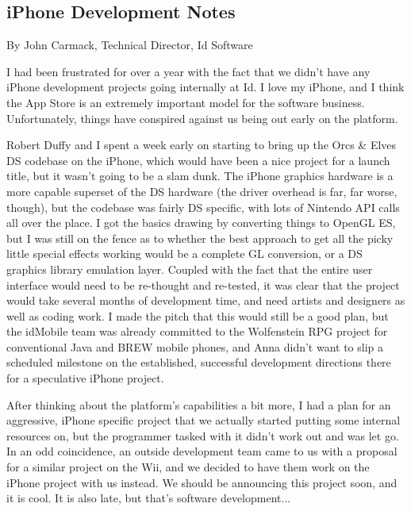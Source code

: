 \documentclass[book.tex]{subfiles}
\begin{document}
    \par
\begin{figure}[H]
\centering
 \end{figure}
 \par
 
\subsection{iPhone Development Notes}

By John Carmack, Technical Director, Id Software\\
\par


\par
I had been frustrated for over a year with the fact that we didn't have any iPhone development projects going internally at Id.  I love my iPhone, and I think the App Store is an extremely important model for the software business.  Unfortunately, things have conspired against us being out early on the platform.\\
\par

Robert Duffy and I spent a week early on starting to bring up the Orcs \& Elves DS codebase on the iPhone, which would have been a nice project for a launch title, but it wasn't going to be a slam dunk.  The iPhone graphics hardware is a more capable superset of the DS hardware (the driver overhead is far, far worse, though), but the codebase was fairly DS specific, with lots of Nintendo API calls all over the place.  I got the basics drawing by converting things to OpenGL ES, but I was still on the fence as to whether the best approach to get all the picky little special effects working would be a complete GL conversion, or a DS graphics library emulation layer.  Coupled with the fact that the entire user interface would need to be re-thought and re-tested, it was clear that the project would take several months of development time, and need artists and designers as well as coding work.  I made the pitch that this would still be a good plan, but the idMobile team was already committed to the Wolfenstein RPG project for conventional Java and BREW mobile phones, and Anna didn't want to slip a scheduled milestone on the established, successful development directions there for a speculative iPhone project.\\
\par

After thinking about the platform's capabilities a bit more, I had a plan for an aggressive, iPhone specific project that we actually started putting some internal resources on, but the programmer tasked with it didn't work out and was let go.  In an odd coincidence, an outside development team came to us with a proposal for a similar project on the Wii, and we decided to have them work on the iPhone project with us instead.  We should be announcing this project soon, and it is cool.  It is also late, but that's software development...\\
\par
\end{document}
